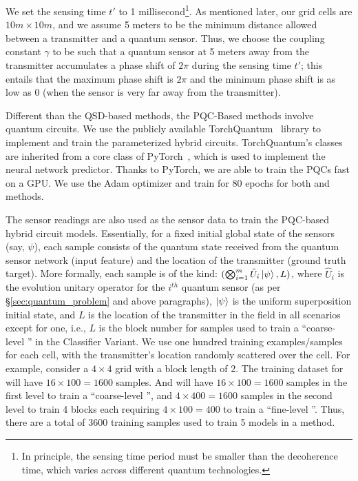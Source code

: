 We set the sensing time $t'$ to 1 millisecond\footnote{In principle, the sensing time period must be smaller than the decoherence time, which varies across different quantum technologies.}. 
As mentioned later, our grid cells are $10m \times 10m$, and we assume 5 meters to be the minimum
distance allowed between a transmitter and a quantum sensor.
Thus, 
we choose 
the coupling constant $\gamma$ to be such that a quantum sensor at 5 meters away 
from the transmitter accumulates a phase shift of $2\pi$ during the sensing time $t'$; this entails
that the maximum phase shift is $2\pi$ and the minimum phase shift is as low as $0$ 
(when the sensor is very far away from the transmitter).

Different than the QSD-based methods, the PQC-Based methods involve quantum circuits.
We use the publicly available TorchQuantum~\cite{quantumnas2022} library to implement and train the parameterized hybrid circuits.
TorchQuantum's classes are inherited from a core class of PyTorch~\cite{pytorch}, which is used to implement the neural network predictor. 
Thanks to PyTorch, we are able to train the PQCs fast on a GPU.
We use the Adam optimizer and train for 80 epochs for both \pqcone and \pqctwo methods.

The sensor readings are also used as the sensor data to train the PQC-based hybrid circuit models. 
Essentially, for a fixed initial global state of the sensors (say, $\psi$), each sample consists of the quantum state received from 
the quantum sensor network (input feature) and the location of the transmitter (ground truth target). 
More formally, each sample is of the kind: 
$(\bigotimes_{i=1}^{m} \hat{U}_i\ket{\psi}, L)$, where $\hat{U}_i$ is the evolution unitary operator for the $i^{th}$ quantum sensor (as per \S\ref{sec:quantum_problem} and above paragraphs), 
$\ket{\psi}$ is the uniform superposition initial state, and $L$ is the location of the transmitter in the field in all scenarios except for one, 
i.e., $L$ is the block number for samples used to train a ``coarse-level \pqcone'' in the \pqctwo Classifier Variant. 
We use one hundred training examples/samples for each cell, with the transmitter's location randomly scattered over the cell. 
For example, consider a $4\times4$ grid with a block length of 2.
The training dataset for \pqcone will have $16\times100=1600$ samples. 
And \pqctwo will have $16\times100=1600$ samples in the first level to train a ``coarse-level \pqcone'', and 
$4\times400=1600$ samples in the second level to train 4 blocks each requiring
$4\times100=400$ to train a ``fine-level \pqcone''.
Thus, there are a total of 3600 training samples used to train 5 models in a \pqctwo method.



